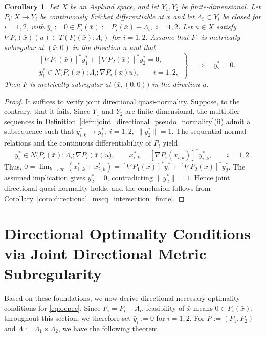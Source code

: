 \documentclass[12pt,twoside,reqno]{amsart}
\newtheorem{corollary}[theorem]{Corollary}
\theoremstyle{definition}
\numberwithin{equation}{section}
\begin{document}
\begin{corollary}\label{coro:intersection_mscq_finite_differentiable}
Let $X$ be an Asplund space, and let $Y_1,Y_2$ be finite-dimensional. 
Let $P_i: X \to Y_i$ be continuously Fr\'echet differentiable at $\bar{x}$ and let $\Lambda_i \subset Y_i$ be closed for $i = 1, 2$, with $\bar{y}_i:=0\in F_i(\bar{x}):=P_i(\bar{x})-\Lambda_i,\; i=1,2$. 
Let $u \in X$ satisfy $\nabla P_i(\bar{x})(u)\in T(P_i(\bar{x});\Lambda_i)$ for $i=1,2$. Assume that $F_1$ is metrically subregular at $(\bar{x},0)$ in the direction $u$ and that
\begin{equation*}
    \left.
    \begin{aligned}
        &[\nabla P_1(\bar{x})]^*y_1^*
        +[\nabla P_2(\bar{x})]^*y_2^*=0,\\
        &y_i^*\in
        N\bigl(P_i(\bar{x});\Lambda_i;\nabla P_i(\bar{x})u\bigr),
        \qquad i=1,2,
    \end{aligned}
    \right\}
    \quad\Longrightarrow\quad y_2^*=0.
\end{equation*}
Then $F$ is metrically subregular at
\(\bigl(\bar{x},(0,0)\bigr)\) in the direction $u$.
\end{corollary}

\begin{proof}
It suffices to verify joint directional quasi-normality. Suppose, to the contrary, that it fails. Since \(Y_1\) and \(Y_2\) are finite-dimensional, the multiplier sequences in
Definition~\ref{defn:joint_directional_pseudo_normality}(ii) admit a subsequence such that $y_{i,k}^*\to y_i^*,\; i=1,2,\; \|y_2^*\|=1$. 
The sequential normal relations and the continuous differentiability
of \(P_i\) yield
\[
    y_i^*\in
    N\bigl(P_i(\bar{x});\Lambda_i;\nabla P_i(\bar{x})u\bigr),
    \qquad
    x_{i,k}^*=[\nabla P_i(x_{i,k})]^*y_{i,k}^*,
    \qquad i=1,2.
\]
Thus, $0=\lim_{k\to\infty}(x_{1,k}^*+x_{2,k}^*)=[\nabla P_1(\bar{x})]^*y_1^*+[\nabla P_2(\bar{x})]^*y_2^*$. 
The assumed implication gives \(y_2^*=0\), contradicting
\(\|y_2^*\|=1\). Hence joint directional quasi-normality holds, and the
conclusion follows from
Corollary~\ref{coro:directional_mscq_intersection_finite}.
 
\end{proof}

\section{Directional Optimality Conditions via Joint Directional Metric Subregularity}\label{sec:applications}
Based on these foundations, we now derive directional necessary
optimality conditions for \eqref{eq:ocpec}. Since
\(F_i=P_i-\Lambda_i\), feasibility of \(\bar{x}\) means
\(0\in F_i(\bar{x})\); throughout this section, we therefore set
\(\bar{y}_i:=0\) for \(i=1,2\). For \(P:=(P_1,P_2)\) and
\(\Lambda:=\Lambda_1\times\Lambda_2\), we have the following theorem.
\end{document}
